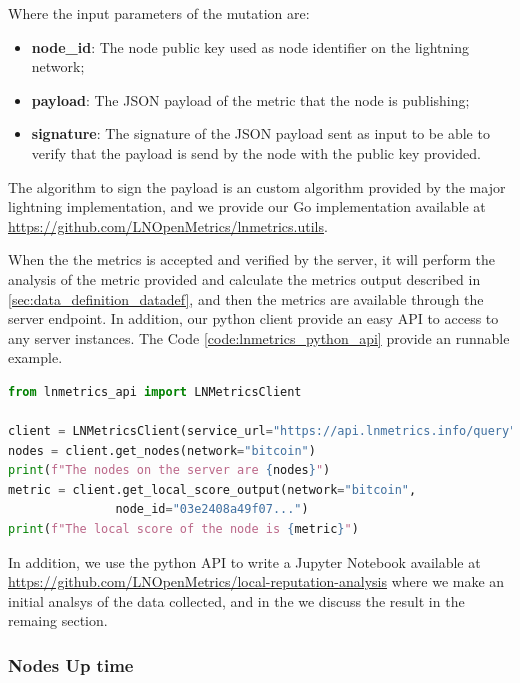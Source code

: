 Where the input parameters of the mutation are:

\begin{itemize}
    \item {\bf node\_id}: The node public key used as node identifier on the lightning network;
    \item {\bf payload}: The JSON payload of the metric that the node is publishing;
    \item {\bf signature}: The signature of the JSON payload sent as input to be able to verify that the 
        payload is send by the node with the public key provided.
\end{itemize}

The algorithm to sign the payload is an custom algorithm provided by the major
lightning implementation, and we provide our Go implementation available 
at \url{https://github.com/LNOpenMetrics/lnmetrics.utils}.

When the the metrics is accepted and verified by the server, it will perform the analysis of the 
metric provided and calculate the metrics output described in \ref{sec:data_definition_datadef}, 
and then the metrics are available through the server endpoint. In addition, our python client 
provide an easy API to access to any server instances. The Code \ref{code:lnmetrics_python_api}
provide an runnable example.


\begin{lstlisting}[language=python, basicstyle=\small,
                  caption={Python script to show a runnable example of our pythion wrapper API usage.}, 
                  label={code:lnmetrics_python_api}]
from lnmetrics_api import LNMetricsClient

client = LNMetricsClient(service_url="https://api.lnmetrics.info/query")
nodes = client.get_nodes(network="bitcoin")
print(f"The nodes on the server are {nodes}")
metric = client.get_local_score_output(network="bitcoin", 
               node_id="03e2408a49f07...")
print(f"The local score of the node is {metric}")
\end{lstlisting}

In addition, we use the python API to write a Jupyter Notebook available at \url{https://github.com/LNOpenMetrics/local-reputation-analysis}
where we make an initial analsys of the data collected, and in the we discuss 
the result in the remaing section.

\subsubsection{Nodes Up time}
\label{sec:node_uptime}

